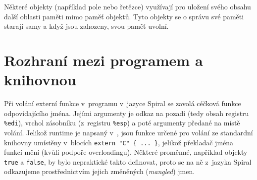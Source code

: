 Některé objekty (například pole nebo řetězce) využívají pro uložení svého obsahu
další oblasti paměti mimo paměť objektů. Tyto objekty se o správu své paměti
starají samy a když jsou zahozeny, svou paměť uvolní.

\section{Rozhraní mezi programem a knihovnou}

Při volání externí funkce v~programu v~jazyce Spiral se zavolá céčková funkce
odpovídajícího jména. Jejími argumenty je odkaz na pozadí (tedy obsah registru
\texttt{\%edi}), vrchol zásobníku (z~registru \texttt{\%esp}) a poté argumenty
předané na místě volání. Jelikož runtime je napsaný v~\Cplusplus{}, jsou
funkce určené pro volání ze standardní knihovny umístěny v~blocích
\texttt{extern "C"~\{ ... \}}, jelikož překladač \Cplusplus{} jména funkcí
mění (kvůli podpoře overloadingu). Některé proměnné, například objekty
\texttt{true} a \texttt{false}, by bylo nepraktické takto definovat, proto se
na ně z~jazyka Spiral odkazujeme prostřednictvím jejich změněných
(\emph{mangled}) jmen.
